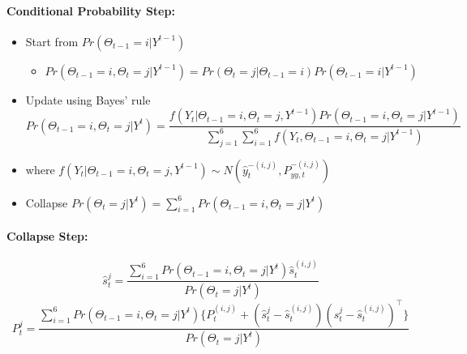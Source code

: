 \documentclass[12pt,letter,leqno]{article}
\theoremstyle{asn}
\theoremstyle{lem}
\theoremstyle{slem}
\theoremstyle{prop}
\theoremstyle{appprop}
\theoremstyle{rem}
\theoremstyle{defn}
\begin{document}
\paragraph{Conditional Probability Step:} 
\begin{itemize}
\item Start from $Pr(\Theta_{t-1}=i|Y^{t-1})$
\begin{itemize}
    \item $Pr(\Theta_{t-1}=i,\Theta_t=j|Y^{t-1}) = Pr(\Theta_t=j|\Theta_{t-1}=i)Pr(\Theta_{t-1}=i|Y^{t-1})$
\end{itemize}
\smallskip
\item Update using Bayes' rule
\begin{equation*}
    Pr(\Theta_{t-1}=i,\Theta_t=j|Y^t)=\frac{f(Y_t|\Theta_{t-1}=i,\Theta_t=j,Y^{t-1})Pr(\Theta_{t-1}=i,\Theta_t=j|Y^{t-1})}{\sum_{j=1}^6 \sum_{i=1}^6 f(Y_t,\Theta_{t-1}=i,\Theta_t=j|Y^{t-1})}
\end{equation*}
\item[] where $f(Y_t|\Theta_{t-1}=i,\Theta_t=j,Y^{t-1}) \sim N(\hat{y}_t^{-(i,j)},P_{yy,t}^{-(i,j)}) $
\smallskip
\item Collapse $Pr(\Theta_t=j|Y^t)=\sum_{i=1}^6 Pr(\Theta_{t-1}=i,\Theta_t=j|Y^t)$
\end{itemize}

\paragraph{Collapse Step:}
\begin{equation*}
  \hat{s}_t^{j} = \frac{\sum_{i=1}^6 Pr(\Theta_{t-1}=i,\Theta_t=j|Y^t)\hat{s}_t^{(i,j)}}{Pr(\Theta_t=j|Y^t)}
\end{equation*}
\begin{equation*}
  P_t^{j} = \frac{\sum_{i=1}^6 Pr(\Theta_{t-1}=i,\Theta_t=j|Y^t)\{P_t^{(i,j)}+(\hat{s}_t^{j}-\hat{s}_t^{(i,j)})(\hat{s}_t^{j}-\hat{s}_t^{(i,j)})^\top\}}{Pr(\Theta_t=j|Y^t)}
\end{equation*}
\end{document}
